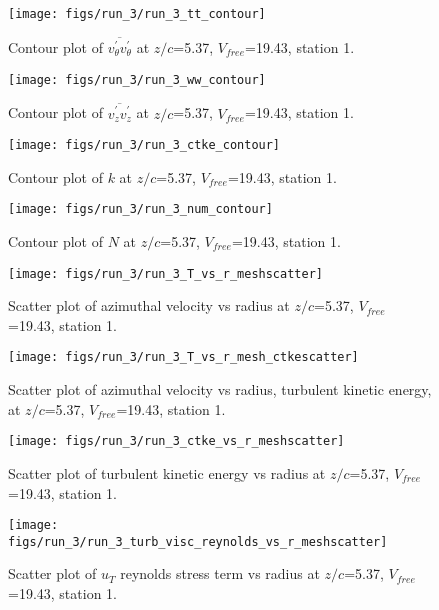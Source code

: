 \begin{figure}[H]
\centering
\texttt{[image: figs/run\_3/run\_3\_tt\_contour]}
\caption{Contour plot of $\overline{v_{\theta}^{\prime} v_{\theta}^{\prime}}$ at $z/c$=5.37, $V_{free}$=19.43, station 1.}
\end{figure}


\begin{figure}[H]
\centering
\texttt{[image: figs/run\_3/run\_3\_ww\_contour]}
\caption{Contour plot of $\overline{v_{z}^{\prime} v_{z}^{\prime}}$ at $z/c$=5.37, $V_{free}$=19.43, station 1.}
\end{figure}


\begin{figure}[H]
\centering
\texttt{[image: figs/run\_3/run\_3\_ctke\_contour]}
\caption{Contour plot of $k$ at $z/c$=5.37, $V_{free}$=19.43, station 1.}
\end{figure}


\begin{figure}[H]
\centering
\texttt{[image: figs/run\_3/run\_3\_num\_contour]}
\caption{Contour plot of $N$ at $z/c$=5.37, $V_{free}$=19.43, station 1.}
\end{figure}


\begin{figure}[H]
\centering
\texttt{[image: figs/run\_3/run\_3\_T\_vs\_r\_meshscatter]}
\caption{Scatter plot of azimuthal velocity vs radius at $z/c$=5.37, $V_{free}$=19.43, station 1.}
\end{figure}


\begin{figure}[H]
\centering
\texttt{[image: figs/run\_3/run\_3\_T\_vs\_r\_mesh\_ctkescatter]}
\caption{Scatter plot of azimuthal velocity vs radius, turbulent kinetic energy, at $z/c$=5.37, $V_{free}$=19.43, station 1.}
\end{figure}


\begin{figure}[H]
\centering
\texttt{[image: figs/run\_3/run\_3\_ctke\_vs\_r\_meshscatter]}
\caption{Scatter plot of turbulent kinetic energy vs radius at $z/c$=5.37, $V_{free}$=19.43, station 1.}
\end{figure}


\begin{figure}[H]
\centering
\texttt{[image: figs/run\_3/run\_3\_turb\_visc\_reynolds\_vs\_r\_meshscatter]}
\caption{Scatter plot of $
u_T$ reynolds stress term vs radius at $z/c$=5.37, $V_{free}$=19.43, station 1.}
\end{figure}


